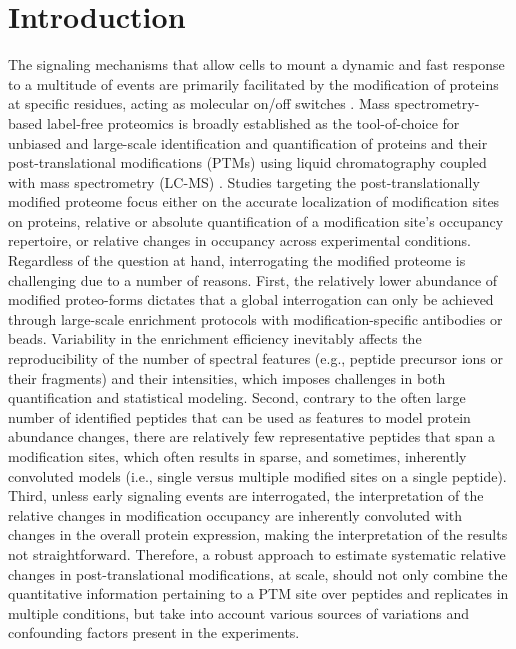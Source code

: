 \documentclass[mcp]{article}
\numberwithin{figure}{section} %
\numberwithin{table}{section}
\begin{document}
\section{Introduction}

The signaling mechanisms that allow cells to mount a dynamic and fast response to a multitude of events are primarily facilitated by the modification of proteins at specific residues, acting as molecular on/off switches\cite{Deribe} \cite{Cohen}. Mass spectrometry-based label-free proteomics is broadly established as the tool-of-choice for unbiased and large-scale identification and quantification of proteins and their post-translational modifications (PTMs) using liquid chromatography coupled with mass spectrometry (LC-MS)\cite{Kall:2011ub} \cite{Roepstorff}. Studies targeting the post-translationally modified proteome focus either on the accurate localization of modification sites on proteins, relative or absolute quantification of a modification site's occupancy repertoire, or relative changes in occupancy across experimental conditions\cite{Mann}. Regardless of the question at hand, interrogating the modified proteome is challenging due to a number of reasons. First, the relatively lower abundance of modified proteo-forms dictates that a global interrogation can only be achieved through large-scale enrichment protocols with modification-specific antibodies or beads. Variability in the enrichment efficiency inevitably affects the reproducibility of the number of spectral features (e.g., peptide precursor ions or their fragments) and their intensities, which imposes challenges in both quantification and statistical modeling. Second, contrary to the often large number of identified peptides that can be used as features to model protein abundance changes, there are relatively few representative peptides that span a modification sites, which often results in sparse, and sometimes, inherently convoluted models (i.e., single versus multiple modified sites on a single peptide). Third, unless early signaling events are interrogated, the interpretation of the relative changes in modification occupancy are inherently convoluted with changes in the overall protein expression, making the interpretation of the results not straightforward\cite{Olsen:2013}. Therefore, a robust approach to estimate systematic relative changes in post-translational modifications, at scale, should not only combine the quantitative information pertaining to a PTM site over peptides and replicates in multiple conditions, but take into account various sources of variations and confounding factors present in the experiments.
 
\end{document}
